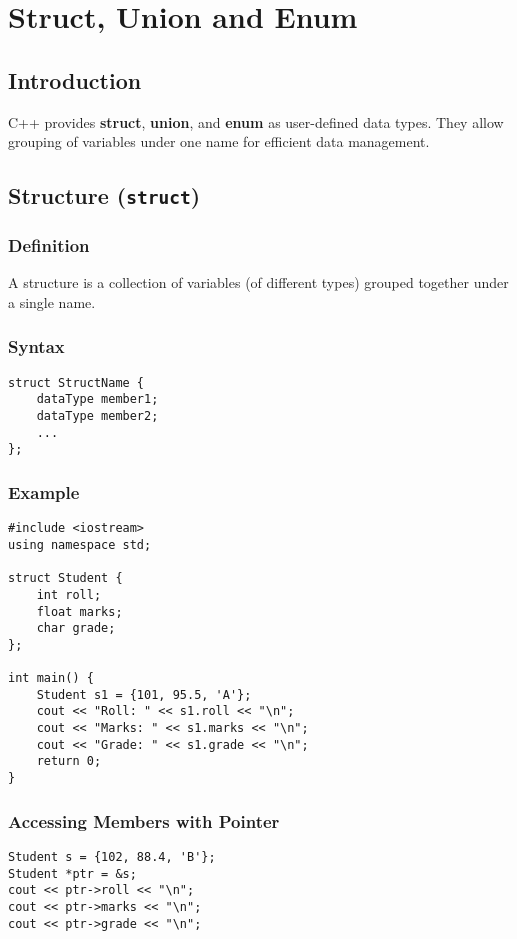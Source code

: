 \chapter{Struct, Union and Enum}

\section*{Introduction}
C++ provides \textbf{struct}, \textbf{union}, and \textbf{enum} as user-defined data types. They allow grouping of variables under one name for efficient data management.

\section{Structure (\texttt{struct})}

\subsection*{Definition}
A structure is a collection of variables (of different types) grouped together under a single name.

\subsection*{Syntax}
\begin{lstlisting}[caption=Syntax of struct]
struct StructName {
    dataType member1;
    dataType member2;
    ...
};
\end{lstlisting}

\subsection*{Example}
\begin{lstlisting}[caption=C++ Code using struct]
#include <iostream>
using namespace std;

struct Student {
    int roll;
    float marks;
    char grade;
};

int main() {
    Student s1 = {101, 95.5, 'A'};
    cout << "Roll: " << s1.roll << "\n";
    cout << "Marks: " << s1.marks << "\n";
    cout << "Grade: " << s1.grade << "\n";
    return 0;
}
\end{lstlisting}

\subsection*{Accessing Members with Pointer}
\begin{lstlisting}[caption=Accessing struct members using pointer]
Student s = {102, 88.4, 'B'};
Student *ptr = &s;
cout << ptr->roll << "\n";
cout << ptr->marks << "\n";
cout << ptr->grade << "\n";
\end{lstlisting}

